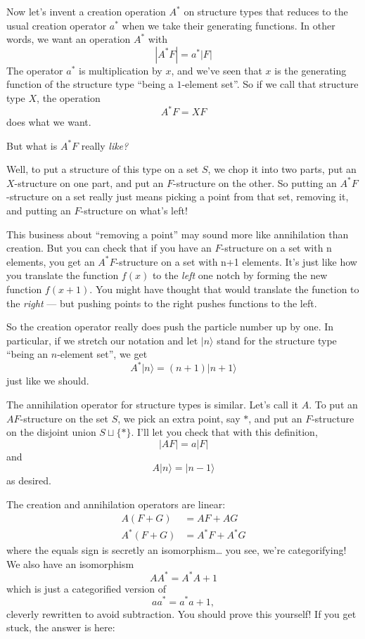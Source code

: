 \documentclass{article}
\begin{document}
Now let's invent a creation operation \(A^*\) on structure types that
reduces to the usual creation operator \(a^*\) when we take their
generating functions. In other words, we want an operation \(A^*\) with
\[|A^*F| = a^*|F|\] The operator \(a^*\) is multiplication by \(x\), and
we've seen that \(x\) is the generating function of the structure type
``being a \(1\)-element set''. So if we call that structure type \(X\),
the operation \[A^*F = XF\] does what we want.

But what is \(A^*F\) really \emph{like?}

Well, to put a structure of this type on a set \(S\), we chop it into
two parts, put an \(X\)-structure on one part, and put an
\(F\)-structure on the other. So putting an \(A^*F\)-structure on a set
really just means picking a point from that set, removing it, and
putting an \(F\)-structure on what's left!

This business about ``removing a point'' may sound more like
annihilation than creation. But you can check that if you have an
\(F\)-structure on a set with n elements, you get an \(A^*F\)-structure
on a set with n+1 elements. It's just like how you translate the
function \(f(x)\) to the \emph{left} one notch by forming the new
function \(f(x+1)\). You might have thought that would translate the
function to the \emph{right} --- but pushing points to the right pushes
functions to the left.

So the creation operator really does push the particle number up by one.
In particular, if we stretch our notation and let \(\vert n\rangle\)
stand for the structure type ``being an \(n\)-element set'', we get
\[A^*\vert n\rangle = (n+1) \vert n+1\rangle\] just like we should.

The annihilation operator for structure types is similar. Let's call it
\(A\). To put an \(AF\)-structure on the set \(S\), we pick an extra
point, say \(*\), and put an \(F\)-structure on the disjoint union
\(S \sqcup \{*\}\). I'll let you check that with this definition,
\[|AF| = a|F|\] and \[A\vert n\rangle = \vert n-1\rangle\] as desired.

The creation and annihilation operators are linear: \[
  \begin{aligned}
    A(F+G) &= AF + AG
  \\A^*(F+G) &= A^*F + A^*G
  \end{aligned}
\] where the equals sign is secretly an isomorphism\ldots{} you see,
we're categorifying! We also have an isomorphism \[A A^* = A^* A + 1\]
which is just a categorified version of \[a a^* = a^* a + 1,\] cleverly
rewritten to avoid subtraction. You should prove this yourself! If you
get stuck, the answer is here:
\end{document}
